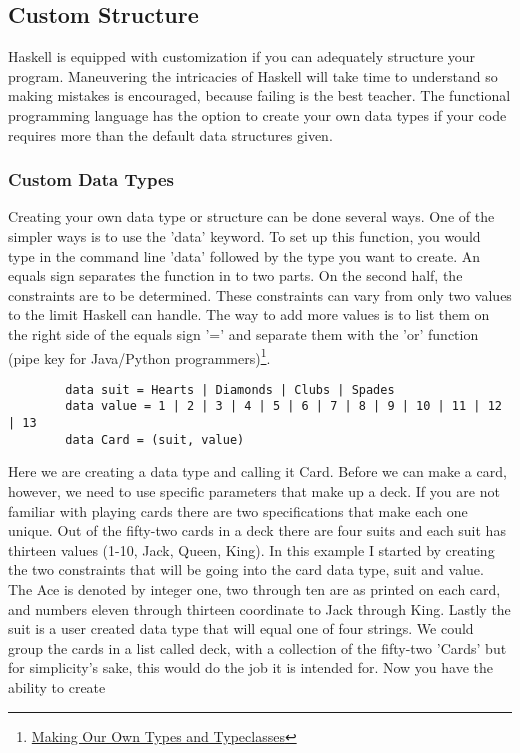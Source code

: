 \documentclass{article}
\begin{document}
\subsection{Custom Structure}
Haskell is equipped with customization if you can adequately structure your program. Maneuvering the intricacies of Haskell will take time to understand so making mistakes is encouraged, because failing is the best teacher. The functional programming language has the option to create your own data types if your code requires more than the default data structures given. 

    \subsubsection{Custom Data Types}
    Creating your own data type or structure can be done several ways. One of the simpler ways is to use the 'data' keyword. To set up this function, you would type in the command line 'data' followed by the type you want to create. An equals sign separates the function in to two parts. On the second half, the constraints are to be determined. These constraints can vary from only two values to the limit Haskell can handle. The way to add more values is to list them on the right side of the equals sign '=' and separate them with the 'or' function (pipe key for Java/Python programmers)\footnote{\href{http://learnyouahaskell.com/making-our-own-types-and-typeclasses}{Making Our Own Types and Typeclasses}}.
    
    \begin{lstlisting}
        data suit = Hearts | Diamonds | Clubs | Spades 
        data value = 1 | 2 | 3 | 4 | 5 | 6 | 7 | 8 | 9 | 10 | 11 | 12 | 13  
        data Card = (suit, value)
    \end{lstlisting}
    
    Here we are creating a data type and calling it Card. Before we can make a card, however, we need to use specific parameters that make up a deck. If you are not familiar with playing cards there are two specifications that make each one unique. Out of the fifty-two cards in a deck there are four suits and each suit has thirteen values (1-10, Jack, Queen, King). In this example I started by creating the two constraints that will be going into the card data type, suit and value. The Ace is denoted by integer one, two through ten are as printed on each card, and numbers eleven through thirteen coordinate to Jack through King. Lastly the suit is a user created data type that will equal one of four strings. We could group the cards in a list called deck, with a collection of the fifty-two 'Cards' but for simplicity's sake, this would do the job it is intended for. Now you have the ability to create
    
\end{document}
